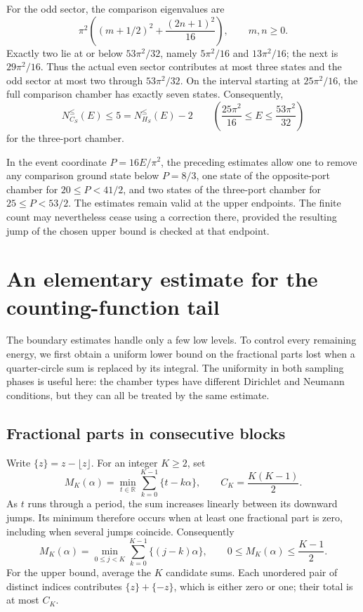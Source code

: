 \documentclass[11pt,reqno]{amsart}
\numberwithin{equation}{section}
\begin{document}
For the odd sector, the comparison eigenvalues are
\[
 \pi^2\left((m+1/2)^2+\frac{(2n+1)^2}{16}\right),
 \qquad m,n\ge0.
\]
Exactly two lie at or below $53\pi^2/32$, namely $5\pi^2/16$ and
$13\pi^2/16$; the next is $29\pi^2/16$. Thus the actual even sector
contributes at most three states and the odd sector at most two through
$53\pi^2/32$. On the interval starting at $25\pi^2/16$, the full
comparison chamber has exactly seven states. Consequently,
\begin{equation}
 N_{C_S}^{\le}(E)\le5=N_{H_S}^{\le}(E)-2
 \qquad
 \left(\frac{25\pi^2}{16}\le E\le\frac{53\pi^2}{32}\right)
 \label{bd:three-port-count}
\end{equation}
for the three-port chamber.

In the event coordinate $P=16E/\pi^2$, the preceding estimates allow
one to remove any comparison ground state below $P=8/3$, one state of
the opposite-port chamber for $20\le P<41/2$, and two states of the
three-port chamber for $25\le P<53/2$. The estimates remain valid at
the upper endpoints. The finite count may nevertheless cease using a
correction there, provided the resulting jump of the chosen upper bound
is checked at that endpoint.

\section{An elementary estimate for the counting-function tail}
\label{sec:counting-tail}

The boundary estimates handle only a few low levels. To control every
remaining energy, we first obtain a uniform lower bound on the fractional
parts lost when a quarter-circle sum is replaced by its integral. The
uniformity in both sampling phases is useful here: the chamber types
have different Dirichlet and Neumann conditions, but they can all be treated
by the same estimate.

\subsection{Fractional parts in consecutive blocks}

Write $\{z\}=z-\lfloor z\rfloor$. For an integer $K\ge2$, set
\[
 M_K(\alpha)=\min_{t\in\mathbb R}
       \sum_{k=0}^{K-1}\{t-k\alpha\},
 \qquad C_K=\frac{K(K-1)}2.
\]
As $t$ runs through a period, the sum increases linearly between its
downward jumps. Its minimum therefore occurs when at least one fractional
part is zero, including when several jumps coincide. Consequently
\begin{equation}
 M_K(\alpha)=\min_{0\le j<K}
       \sum_{k=0}^{K-1}\{(j-k)\alpha\},
 \qquad 0\le M_K(\alpha)\le\frac{K-1}{2}.
 \label{eq:block-minimum}
\end{equation}
For the upper bound, average the $K$ candidate sums. Each unordered pair
of distinct indices contributes $\{z\}+\{-z\}$, which is either zero or
one; their total is at most $C_K$.
\end{document}
